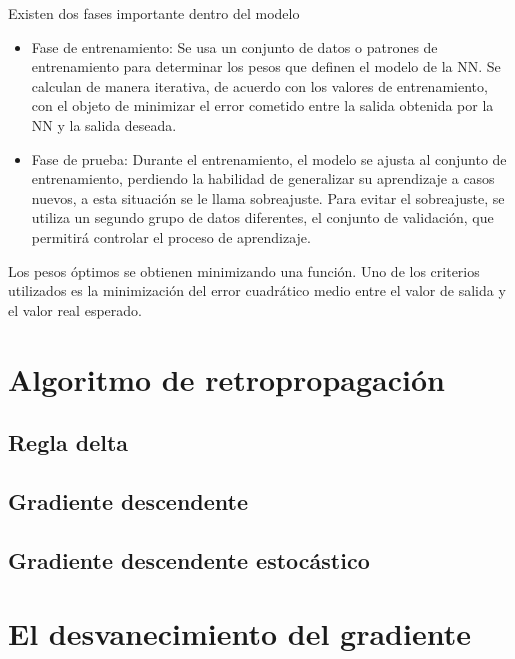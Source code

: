 Existen dos fases importante dentro del modelo
\begin{itemize}
	\item Fase de entrenamiento: Se usa un conjunto de datos o patrones de entrenamiento para determinar los pesos que definen el modelo de la NN. Se calculan de manera iterativa, de acuerdo con los valores de entrenamiento, con el objeto de minimizar el error cometido entre la salida obtenida por la NN y la salida deseada.

	\item Fase de prueba: Durante el entrenamiento, el modelo se ajusta al conjunto de entrenamiento, perdiendo la habilidad de generalizar su aprendizaje a casos nuevos, a esta situación se le llama sobreajuste.
	Para evitar el sobreajuste, se utiliza un segundo grupo de datos diferentes, el conjunto de validación, que permitirá controlar el proceso de aprendizaje.
\end{itemize}
Los pesos óptimos se obtienen minimizando una función. Uno de los criterios utilizados es la minimización del error cuadrático medio entre el valor de salida y el valor real esperado.

\section{Algoritmo de retropropagación}
\subsection{Regla delta}
\subsection{Gradiente descendente}
\subsection{Gradiente descendente estocástico}

\section{El desvanecimiento del gradiente}
